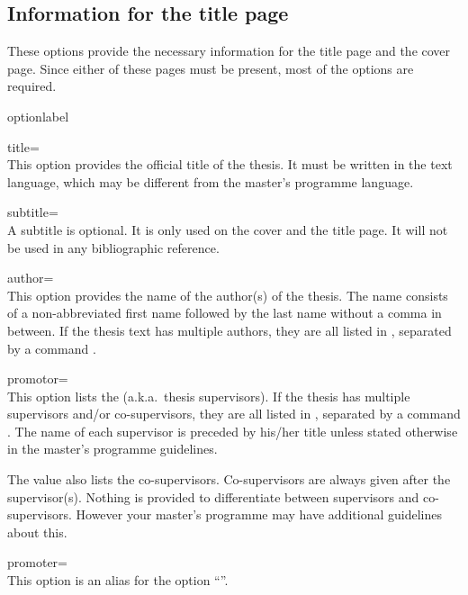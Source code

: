 \subsection{Information for the title page}
These options provide the necessary information for the title page and the
cover page. Since either of these pages must be present, most of the
options are required.

\begin{labelled}{optionlabel}
\item[title=\meta{title}]\\
  This option provides the official title  of the thesis. It
  must be written in the text language, which may be different from the
  master's programme language.

\item[subtitle=\meta{stitle}]\\
  A subtitle  is optional. It is only used on the cover and
  the title page. It will not be used in any bibliographic reference.

\item[author=\meta{authors}]
  \label{opt:author}\\
  This option provides the name  of the author(s) of the
  thesis. The name consists of a non-abbreviated first name followed by the
  last name without a comma in between. If the thesis text has multiple
  authors, they are all listed in , separated by a command
  .

\item[promotor=\meta{promoters}]
  \\
  This option lists the  (a.k.a.\ thesis supervisors). If
  the thesis has multiple supervisors and/or co-supervisors, they are all
  listed in , separated by a command . The name of
  each supervisor is preceded by his/her title unless stated otherwise in
  the master's programme guidelines.

  The  value also lists the co-supervisors. Co-supervisors are
  always given after the supervisor(s). Nothing is provided to differentiate
  between supervisors and co-supervisors. However your master's programme may
  have additional guidelines about this.

\item[promoter=\meta{promoters}]
  \\
  This option is an alias for the option ``''.


\end{labelled}

